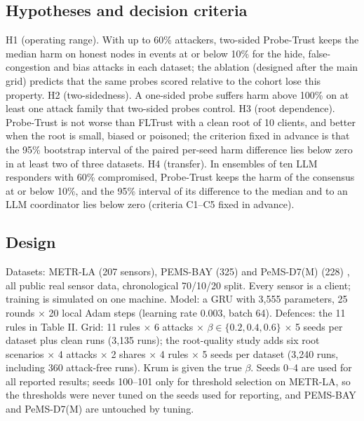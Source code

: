 \documentclass[journal]{IEEEtran}
\begin{document}
\subsection{Hypotheses and decision criteria}
H1 (operating range). With up to 60\% attackers, two-sided Probe-Trust keeps the median harm on honest nodes in events at or below 10\% for the hide, false-congestion and bias attacks in each dataset; the ablation (designed after the main grid) predicts that the same probes scored relative to the cohort lose this property. H2 (two-sidedness). A one-sided probe suffers harm above 100\% on at least one attack family that two-sided probes control. H3 (root dependence). Probe-Trust is not worse than FLTrust with a clean root of 10 clients, and better when the root is small, biased or poisoned; the criterion fixed in advance is that the 95\% bootstrap interval of the paired per-seed harm difference lies below zero in at least two of three datasets. H4 (transfer). In ensembles of ten LLM responders with 60\% compromised, Probe-Trust keeps the harm of the consensus at or below 10\%, and the 95\% interval of its difference to the median and to an LLM coordinator lies below zero (criteria C1--C5 fixed in advance).

\subsection{Design}
Datasets: METR-LA (207 sensors), PEMS-BAY (325) \cite{dcrnn} and PeMS-D7(M) (228) \cite{stgcn}, all public real sensor data, chronological 70/10/20 split. Every sensor is a client; training is simulated on one machine. Model: a GRU with 3,555 parameters, 25 rounds \ensuremath{\times} 20 local Adam steps (learning rate 0.003, batch 64). Defences: the 11 rules in Table II. Grid: 11 rules \ensuremath{\times} 6 attacks \ensuremath{\times} $\beta\in\{0.2,0.4,0.6\}$ \ensuremath{\times} 5 seeds per dataset plus clean runs (3,135 runs); the root-quality study adds six root scenarios \ensuremath{\times} 4 attacks \ensuremath{\times} 2 shares \ensuremath{\times} 4 rules \ensuremath{\times} 5 seeds per dataset (3,240 runs, including 360 attack-free runs). Krum is given the true \ensuremath{\beta}. Seeds 0--4 are used for all reported results; seeds 100--101 only for threshold selection on METR-LA, so the thresholds were never tuned on the seeds used for reporting, and PEMS-BAY and PeMS-D7(M) are untouched by tuning.
\end{document}
